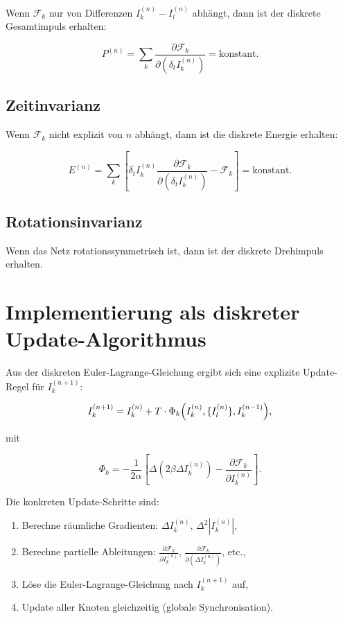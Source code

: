 Wenn \( \mathcal{F}_k \) nur von Differenzen \( I_k^{(n)} - I_l^{(n)} \) abhängt, dann ist der diskrete Gesamtimpuls erhalten:

\[
P^{(n)} = \sum_k \frac{\partial \mathcal{F}_k}{\partial (\delta_t I_k^{(n)})} = \text{konstant}.
\]

\subsection{Zeitinvarianz}
\label{sub:zeitinvarianz}

Wenn \( \mathcal{F}_k \) nicht explizit von \( n \) abhängt, dann ist die diskrete Energie erhalten:

\[
E^{(n)} = \sum_k \left[ \delta_t I_k^{(n)} \frac{\partial \mathcal{F}_k}{\partial (\delta_t I_k^{(n)})} - \mathcal{F}_k \right] = \text{konstant}.
\]

\subsection{Rotationsinvarianz}
\label{sub:rotationsinvarianz}

Wenn das Netz rotationssymmetrisch ist, dann ist der diskrete Drehimpuls erhalten.

\section{Implementierung als diskreter Update-Algorithmus}
\label{sec:update_algorithmus}

Aus der diskreten Euler-Lagrange-Gleichung ergibt sich eine explizite Update-Regel für \( I_k^{(n+1)} \):

\[
I_k^{(n+1)} = I_k^{(n)} + T \cdot \Phi_k \Bigl( I_k^{(n)}, \{I_l^{(n)}\}, I_k^{(n-1)} \Bigr),
\]

mit

\[
\Phi_k = -\frac{1}{2\alpha} \left[ \Delta \left( 2\beta \Delta I_k^{(n)} \right) - \frac{\partial \mathcal{F}_k}{\partial I_k^{(n)}} \right].
\]

Die konkreten Update-Schritte sind:

\begin{enumerate}
    \item Berechne räumliche Gradienten: \( \Delta I_k^{(n)} \), \( \Delta^2 |I_k^{(n)}| \),
    \item Berechne partielle Ableitungen: \( \frac{\partial \mathcal{F}_k}{\partial I_k^{(n)}} \), \( \frac{\partial \mathcal{F}_k}{\partial (\Delta I_k^{(n)})} \), etc.,
    \item Löse die Euler-Lagrange-Gleichung nach \( I_k^{(n+1)} \) auf,
    \item Update aller Knoten gleichzeitig (globale Synchronisation).
\end{enumerate}

